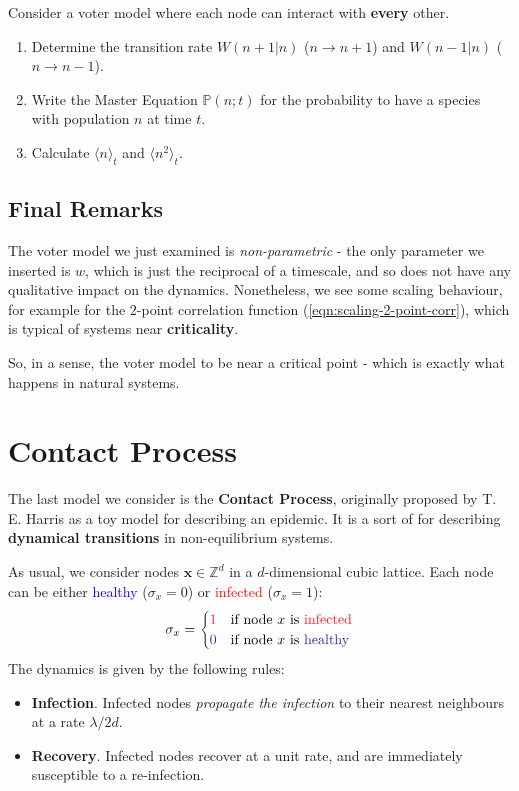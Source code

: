 \documentclass[../../main.tex]{subfiles}
\begin{document}
\begin{exo}
    Consider a voter model where each node can interact with \textbf{every} other.
    
    \begin{enumerate}
        \item Determine the transition rate $W(n+1|n)$ ($n \to n+1$) and $W(n-1|n)$ ($n \to n-1$).
        \item Write the Master Equation $\mathbb{P}(n;t)$ for the probability to have a species with population $n$ at time $t$.
        \item Calculate $\langle n \rangle_t$ and $\langle n^2 \rangle_t$.
    \end{enumerate}
\end{exo}

\subsection{Final Remarks}
The voter model we just examined is \textit{non-parametric} - the only parameter we inserted is $w$, which is just the reciprocal of a timescale, and so does not have any qualitative impact on the dynamics. Nonetheless, we see some scaling behaviour, for example for the $2$-point correlation function (\ref{eqn:scaling-2-point-corr}), which is typical of systems near \textbf{criticality}. 

So, in a sense, the voter model  to be near a critical point - which is exactly what happens in natural systems.

\section{Contact Process}
The last model we consider is the \textbf{Contact Process}, originally proposed by T. E. Harris as a toy model for describing an epidemic. It is a sort of  for describing \textbf{dynamical transitions} in non-equilibrium systems. 

\medskip

As usual, we consider nodes $\bm{x} \in \mathbb{Z}^d$ in a $d$-dimensional cubic lattice. Each node can be either 
\textcolor{Blue}{healthy}  ($\sigma_x = 0$) or \textcolor{Red}{infected} ($\sigma_x = 1$):
\begin{align*}
    \sigma_x = \begin{cases}
        \textcolor{Red}{1} & \text{if node $x$ is \textcolor{Red}{infected}}\\
        \textcolor{Blue}{0} & \text{if node $x$ is \textcolor{Blue}{healthy}}
    \end{cases}
\end{align*}
The dynamics is given by the following rules:
\begin{itemize}
    \item \textbf{Infection}. Infected nodes \textit{propagate the infection} to their nearest neighbours at a rate $\lambda/2d$. 
    \item \textbf{Recovery}. Infected nodes recover at a unit rate, and are immediately susceptible to a re-infection. 
\end{itemize}
\end{document}
